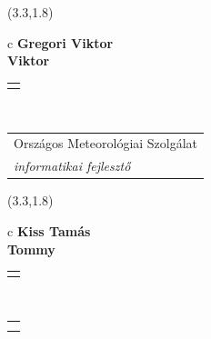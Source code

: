 \documentclass[11pt]{article}
\begin{document}
\makebox(3.3,1.8){
  \renewcommand\arraystretch{1.3}
  \begin{tabular}[c]{c}
    \hspace{8.5mm}
    \LARGE\bf{ Gregori Viktor }\\
    \hspace{8.5mm}
    \Large{ Viktor }\\
    \renewcommand\arraystretch{3}
    \begin{tabular}[c]{c}
      \centering
      \fontfamily{phv}\selectfont{
        \textbf{
          \textsc{
            \scriptsize{
            \color{Dark}{ Ismerkedő }\color{Bright}{ Webmester }\color{Bright}{ Sminkmester }\color{Bright}{ Programozó }
            }
          }
        }
      }
    \end{tabular}
    \\
    \renewcommand\arraystretch{1}
    \begin{tabular}{p{3.3in}}
      \hspace{.7cm}Országos Meteorológiai Szolgálat\\
      \hspace{.7cm}\emph{ informatikai fejlesztő }\\
    \end{tabular}
  \end{tabular}
}

\makebox(3.3,1.8){
  \renewcommand\arraystretch{1.3}
  \begin{tabular}[c]{c}
    \hspace{8.5mm}
    \LARGE\bf{ Kiss Tamás }\\
    \hspace{8.5mm}
    \Large{ Tommy }\\
    \renewcommand\arraystretch{3}
    \begin{tabular}[c]{c}
      \centering
      \fontfamily{phv}\selectfont{
        \textbf{
          \textsc{
            \scriptsize{
            \color{Bright}{ Ismerkedő }\color{Dark}{ Webmester }\color{Dark}{ Sminkmester }\color{Dark}{ Programozó }
            }
          }
        }
      }
    \end{tabular}
    \\
    \renewcommand\arraystretch{1}
    \begin{tabular}{p{3.3in}}
      \hspace{.7cm}\\
      \hspace{.7cm}\emph{  }\\
    \end{tabular}
  \end{tabular}
}
\end{document}
